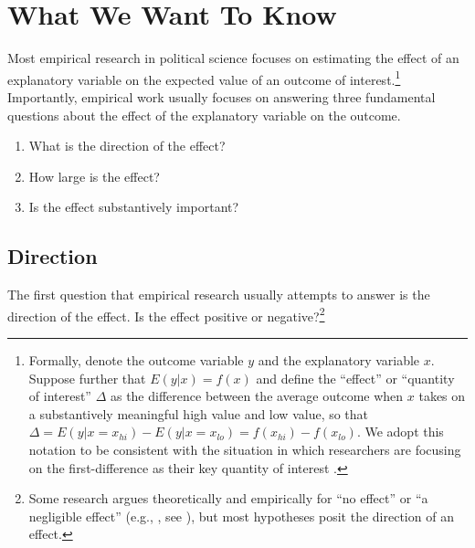 \documentclass[12pt]{article}
\begin{document}
\section*{What We Want To Know}

Most empirical research in political science focuses on estimating the effect of an explanatory variable on the expected value of an outcome of interest.\footnote{Formally, denote the outcome variable $y$ and the explanatory variable $x$. Suppose further that $E(y | x) = f(x)$ and define the ``effect'' or ``quantity of interest'' $\Delta$ as the difference between the average outcome when $x$ takes on a substantively meaningful high value and low value, so that $\Delta = E(y | x = x_{hi}) - E(y | x = x_{lo}) = f(x_{hi}) - f(x_{lo})$. We adopt this notation to be consistent with the situation in which researchers are focusing on the first-difference as their key quantity of interest \citep{KingTomzWittenberg2000}.} Importantly, empirical work usually focuses on answering three fundamental questions about the effect of the explanatory variable on the outcome.

\begin{enumerate}
\item What is the direction of the effect?
\item How large is the effect?
\item Is the effect substantively important?
\end{enumerate}

\subsection*{Direction}

The first question that empirical research usually attempts to answer is the direction of the effect. Is the effect positive or negative?\footnote{Some research argues theoretically and empirically for ``no effect'' or ``a negligible effect'' (e.g., \citealt{KamPalmer2008}, see \citealt{Rainey2014}), but most hypotheses posit the direction of an effect.} 
\end{document}
